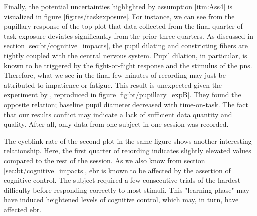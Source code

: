 Finally, the potential uncertainties highlighted by assumption \ref{itm:Ass4} is visualized in figure \ref{fig:res/taskexposure}. For instance, we can see from the pupillary response of the top plot that data collected from the final quarter of task exposure deviates significantly from the prior three quarters. As discussed in section \ref{sec:bt/cognitive_impacts}, the pupil dilating and constricting fibers are tightly coupled with the central nervous system. Pupil dilation, in particular, is known to be triggered by the fight-or-flight response and the stimulus of the \acrshort{pns}. Therefore, what we see in the final few minutes of recording may just be attributed to impatience or fatigue. This result is unexpected given the experiment by \textcite{hopstaken2015}, reproduced in figure \ref{fig:bt/pupillary_expB}. They found the opposite relation; baseline pupil diameter decreased with time-on-task. The fact that our results conflict may indicate a lack of sufficient data quantity and quality. After all, only data from one subject in one session was recorded.

The eyeblink rate of the second plot in the same figure shows another interesting relationship. Here, the first quarter of recording indicates slightly elevated values compared to the rest of the session. As we also know from section \ref{sec:bt/cognitive_impacts}, \acrshort{ebr} is known to be affected by the assertion of cognitive control. The subject required a few consecutive trials of the hardest difficulty before responding correctly to most stimuli. This "learning phase" may have induced heightened levels of cognitive control, which may, in turn, have affected \acrshort{ebr}.
